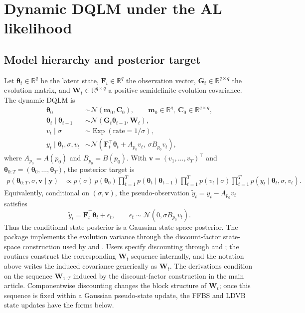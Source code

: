 \documentclass[nojss,noheadings]{jss}
\newcommand{\R}{\mathbb{R}}
\newcommand{\vect}[1]{\bm{#1}}
\newcommand{\mat}[1]{\mathbf{#1}}
\newcommand{\N}{\mathcal{N}}
\newcommand{\Exp}{\operatorname{Exp}}
\begin{document}
\section{Dynamic DQLM under the AL likelihood}
\label{sec:dyn_dqlm}

\subsection{Model hierarchy and posterior target}

Let $\vect{\theta}_t\in\R^q$ be the latent state, $\mat{F}_t\in\R^q$ the
observation vector, $\mat{G}_t\in\R^{q\times q}$ the evolution matrix, and
$\mat{W}_t\in\R^{q\times q}$ a positive semidefinite evolution covariance. The
dynamic DQLM is
\begin{align}
\vect{\theta}_0 &\sim \N(\vect{m}_0,\mat{C}_0), \qquad
  \vect{m}_0\in\R^q,\ \mat{C}_0\in\R^{q\times q}, \\
\vect{\theta}_t\mid\vect{\theta}_{t-1}
&\sim \N(\mat{G}_t\vect{\theta}_{t-1},\mat{W}_t), \\
v_t\mid\sigma &\sim \Exp(\text{rate}=1/\sigma), \\
y_t\mid\vect{\theta}_t,\sigma,v_t
&\sim \N(\mat{F}_t^\top\vect{\theta}_t + A_{p_0} v_t,\ \sigma B_{p_0} v_t),
\label{eq:dyn_dqlm_hierarchy}
\end{align}
where $A_{p_0}=A(p_0)$ and $B_{p_0}=B(p_0)$. With
$\vect{v}=(v_1,\ldots,v_T)^\top$ and
$\vect{\theta}_{0:T}=(\vect{\theta}_0,\ldots,\vect{\theta}_T)$, the posterior
target is
\begin{align}
p(\vect{\theta}_{0:T},\sigma,\vect{v}\mid\vect{y})
&\propto
p(\sigma)\,p(\vect{\theta}_0)
\prod_{t=1}^T p(\vect{\theta}_t\mid\vect{\theta}_{t-1})
\prod_{t=1}^T p(v_t\mid\sigma)
\prod_{t=1}^T p(y_t\mid\vect{\theta}_t,\sigma,v_t).
\label{eq:dyn_dqlm_joint}
\end{align}
Equivalently, conditional on $(\sigma,\vect{v})$, the pseudo-observation
$\tilde y_t=y_t-A_{p_0}v_t$ satisfies
\begin{equation}
\tilde y_t=\mat{F}_t^\top\vect{\theta}_t+\epsilon_t,\qquad
\epsilon_t\sim\N(0,\sigma B_{p_0}v_t).
\label{eq:dyn_dqlm_pseudo}
\end{equation}
Thus the conditional state posterior is a Gaussian state-space posterior.
The package implements the evolution variance through the discount-factor
state-space construction used by  and .
Users specify discounting through  and ; the routines
construct the corresponding $\mat{W}_t$ sequence internally, and the notation
above writes the induced covariance generically as $\mat{W}_t$.
The derivations condition on the sequence $\mat{W}_{1:T}$ induced by the
discount-factor construction in the main article. Componentwise discounting
changes the block structure of $\mat{W}_t$; once this sequence is fixed within
a Gaussian pseudo-state update, the FFBS and LDVB state updates have the forms
below.
\end{document}
